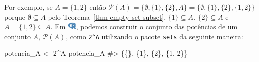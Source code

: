 \documentclass[
  letterpaper,
]{book}
\newenvironment{Shaded}{\begin{snugshade}}{\end{snugshade}}
\newcommand{\CommentTok}[1]{\textcolor[rgb]{0.37,0.37,0.37}{#1}}
\newcommand{\DecValTok}[1]{\textcolor[rgb]{0.68,0.00,0.00}{#1}}
\newcommand{\NormalTok}[1]{\textcolor[rgb]{0.00,0.23,0.31}{#1}}
\newcommand{\OtherTok}[1]{\textcolor[rgb]{0.00,0.23,0.31}{#1}}
\newcommand{\SpecialCharTok}[1]{\textcolor[rgb]{0.37,0.37,0.37}{#1}}
\theoremstyle{definition}
\theoremstyle{plain}
\theoremstyle{remark}
\begin{document}
Por exemplo, se \(A = \{ 1, 2 \}\) então
\(\mathcal{P}(A) = \{ \emptyset, \{ 1 \}, \{ 2 \}, A \} = \{ \emptyset, \{ 1 \}, \{ 2 \}, \{ 1,2 \} \}\)
porque \(\emptyset \subseteq A\) pelo
Teorema~\ref{thm-empty-set-subset}, \(\{ 1 \} \subseteq A\),
\(\{ 2 \} \subseteq A\) e \(A = \{ 1, 2 \} \subseteq A\). Em
\includegraphics[width=1.13em,height=1em]{naive_set_theory_files/figure-pdf/fa-icon-9b00320707d42527dde67262afb33ded.pdf},
podemos construir o conjunto das potências de um conjunto \(A\),
\(\mathcal{P}(A)\), como \texttt{2\^{}A} utilizando o pacote
\texttt{sets} da seguinte maneira:

\begin{Shaded}
\begin{Highlighting}[]
\NormalTok{potencia\_A }\OtherTok{\textless{}{-}} \DecValTok{2}\SpecialCharTok{\^{}}\NormalTok{A}
\NormalTok{potencia\_A}
\CommentTok{\#\textgreater{} \{\{\}, \{1\}, \{2\}, \{1, 2\}\}}
\end{Highlighting}
\end{Shaded}



\backmatter
\end{document}
